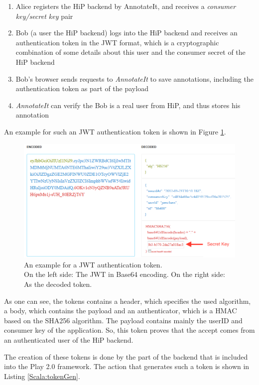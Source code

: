 \begin{enumerate}
\item Alice registers the \ac{HiP} backend by AnnotateIt, and receives a \emph{consumer key/secret key} pair
\item Bob (a user the \ac{HiP} backend) logs into the \ac{HiP} backend and receives an authentication token in the \ac{JWT} format, which is a cryptographic combination of some details about this user and the consumer secret of the \ac{HiP} backend
\item Bob's browser sends requests to \emph{AnnotateIt} to save annotations, including the authentication token as part of the payload
\item \emph{AnnotateIt} can verify the Bob is a real user from \ac{HiP}, and thus stores his annotation
\end{enumerate}

An example for such an \ac{JWT} authentication token is shown in Figure \ref{JWT}.

\begin{figure}[th]
\centerline{\includegraphics[width=1\textwidth]{gfx/JWT_b}}
\caption{An example for a JWT authentication token. \\On the left side: The JWT in Base64 encoding. On the right side: As the decoded token.}
\label{JWT}
\end{figure}

As one can see, the tokens contains a header, which specifies the used algorithm, a body, which contains the payload and an authenticator, which is a \ac{HMAC} based on the \ac{SHA256} algorithm. The payload contains mainly the userID and 
consumer key of the application. So, this token proves that the accept comes from an authenticated user of the \ac{HiP} backend.

The creation of these tokens is done by the part of the backend that is included into the Play 2.0 framework. The action that generates such a token is shown in Listing \ref{Scala:tokenGen}.

